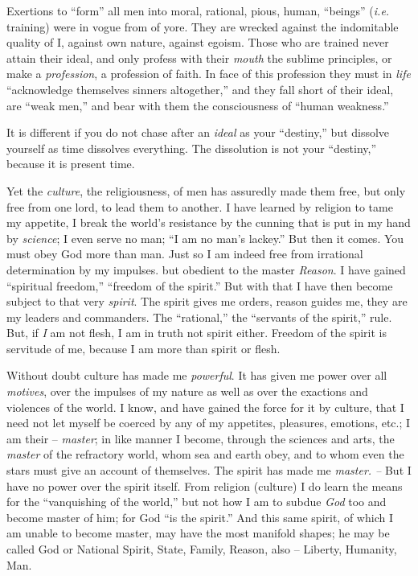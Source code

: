 \documentclass[12pt,a4paper]{book}
\begin{document}
Exertions to ``form'' all men into moral, rational, pious, human, 
``beings'' (\textit{i.e.} training) were in vogue from of yore. They are 
wrecked against the indomitable quality of I, against own nature, against 
egoism. Those who are trained never attain their ideal, and only profess with 
their \textit{mouth} the sublime principles, or make a \textit{profession}, a 
profession of faith. In face of this profession they must in \textit{life} 
``acknowledge themselves sinners altogether,'' and they fall short of their 
ideal, are ``weak men,'' and bear with them the consciousness of ``human 
weakness.''

It is different if you do not chase after an \textit{ideal} as your 
``destiny,'' but dissolve yourself as time dissolves everything. The 
dissolution is not your ``destiny,'' because it is present time.

Yet the \textit{culture}, the religiousness, of men has assuredly made them 
free, but only free from one lord, to lead them to another. I have learned by 
religion to tame my appetite, I break the world's resistance by the cunning 
that is put in my hand by \textit{science}; I even serve no man; ``I am no 
man's lackey.'' But then it comes. You must obey God more than man. Just so I 
am indeed free from irrational determination by my impulses. but obedient to 
the master \textit{Reason}. I have gained ``spiritual freedom,'' ``freedom 
of the spirit.'' But with that I have then become subject to that very 
\textit{spirit}. The spirit gives me orders, reason guides me, they are my 
leaders and commanders. The ``rational,'' the ``servants of the spirit,'' 
rule. But, if \textit{I} am not flesh, I am in truth not spirit either. 
Freedom of the spirit is servitude of me, because I am more than spirit or 
flesh.

Without doubt culture has made me \textit{powerful}. It has given me power 
over all \textit{motives}, over the impulses of my nature as well as over the 
exactions and violences of the world. I know, and have gained the force for it 
by culture, that I need not let myself be coerced by any of my appetites, 
pleasures, emotions, etc.; I am their -- \textit{master}; in like manner I 
become, through the sciences and arts, the \textit{master} of the refractory 
world, whom sea and earth obey, and to whom even the stars must give an 
account of themselves. The spirit has made me \textit{master. --} But I have 
no power over the spirit itself. From religion (culture) I do learn the means 
for the ``vanquishing of the world,'' but not how I am to subdue 
\textit{God} too and become master of him; for God ``is the spirit.'' And 
this same spirit, of which I am unable to become master, may have the most 
manifold shapes; he may be called God or National Spirit, State, Family, 
Reason, also -- Liberty, Humanity, Man.
\end{document}
